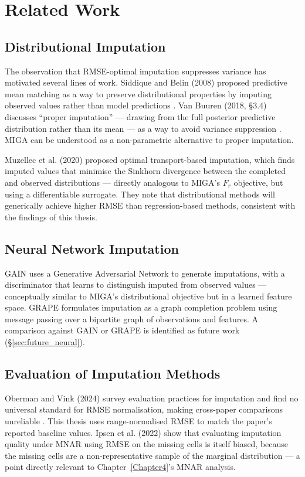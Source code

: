 
\section{Related Work}

\subsection{Distributional Imputation}

The observation that RMSE-optimal imputation suppresses variance has motivated several lines of work. Siddique and Belin (2008) proposed predictive mean matching as a way to preserve distributional properties by imputing observed values rather than model predictions \cite{SiddiqueeBelin2008}. Van Buuren (2018, \S3.4) discusses ``proper imputation'' --- drawing from the full posterior predictive distribution rather than its mean --- as a way to avoid variance suppression \cite{vanBuuren2018}. MIGA can be understood as a non-parametric alternative to proper imputation.

Muzellec et al. (2020) proposed optimal transport-based imputation, which finds imputed values that minimise the Sinkhorn divergence between the completed and observed distributions \cite{Muzellec2020} --- directly analogous to MIGA's $F_r$ objective, but using a differentiable surrogate. They note that distributional methods will generically achieve higher RMSE than regression-based methods, consistent with the findings of this thesis.

\subsection{Neural Network Imputation}

GAIN \cite{Yoon2018} uses a Generative Adversarial Network to generate imputations, with a discriminator that learns to distinguish imputed from observed values --- conceptually similar to MIGA's distributional objective but in a learned feature space. GRAPE \cite{You2020} formulates imputation as a graph completion problem using message passing over a bipartite graph of observations and features. A comparison against GAIN or GRAPE is identified as future work (\S\ref{sec:future_neural}).

\subsection{Evaluation of Imputation Methods}

Oberman and Vink (2024) survey evaluation practices for imputation and find no universal standard for RMSE normalisation, making cross-paper comparisons unreliable \cite{ObermanVink2024}. This thesis uses range-normalised RMSE to match the paper's reported baseline values. Ipsen et al. (2022) show that evaluating imputation quality under MNAR using RMSE on the missing cells is itself biased, because the missing cells are a non-representative sample of the marginal distribution \cite{Ipsen2022} --- a point directly relevant to Chapter~\ref{Chapter4}'s MNAR analysis.
